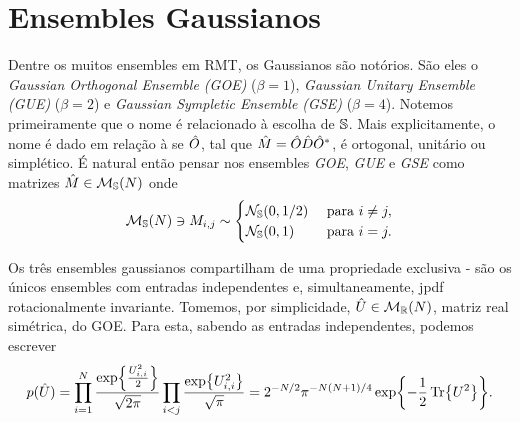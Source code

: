 \section{Ensembles Gaussianos}
\label{Section: Ensembles Gaussianos}

Dentre os muitos ensembles em RMT, os Gaussianos são notórios. São eles o \textit{Gaussian Orthogonal Ensemble (GOE)} ($\beta=1$), \textit{Gaussian Unitary Ensemble (GUE)} ($\beta=2$) e \textit{Gaussian Sympletic Ensemble (GSE)} ($\beta=4$). Notemos primeiramente que o nome é relacionado à escolha de $\mathbb{S}$. Mais explicitamente, o nome é dado em relação à se $\hat O$, tal que $\hat M = \hat O\hat D\hat O^*$, é ortogonal, unitário ou simplético. É natural então pensar nos ensembles \textit{GOE}, \textit{GUE} e \textit{GSE} como matrizes $\hat M \in \mathcal{M}_{\mathbb{S}}(N)$ onde 
$$
\mathcal{M}_{\mathbb{S}}(N) \ni M_{i,j} \sim
\begin{cases}
	\mathcal{N}_{\mathbb{S}}(0,1/2) &  \ \text{para} \ i \neq j,\\
	\mathcal{N}_{\mathbb{S}}(0,1) & \ \text{para} \ i = j.
\end{cases}
$$

Os três ensembles gaussianos compartilham de uma propriedade exclusiva - são os únicos ensembles com entradas independentes e, simultaneamente, jpdf rotacionalmente invariante. Tomemos, por simplicidade, $\hat U \in \mathcal{M}_{\mathbb{R}}(N)$, matriz real simétrica, do GOE. Para esta, sabendo as entradas independentes, podemos escrever $$p(\hat U) = \prod_{i=1}^{N}\frac{\exp{\frac{U_{i,i}^2}{2}}}{\sqrt{2\pi}} \prod_{i<j} \frac{\exp{U_{i,i}^2}}{\sqrt{\pi}} = 2^{-N/2} \pi^{-N(N + 1)/4} \exp{-\frac{1}{2} \Tr{U^2}}.$$

